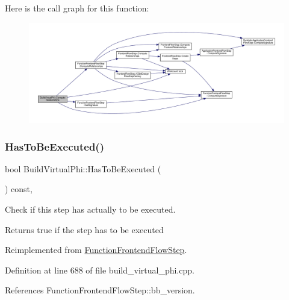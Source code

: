 Here is the call graph for this function\+:
\nopagebreak
\begin{figure}[H]
\begin{center}
\leavevmode
\includegraphics[width=350pt]{d8/d9b/classBuildVirtualPhi_a91ad5ae49dfe85e06f47e88df0dab90d_cgraph}
\end{center}
\end{figure}
\mbox{\label{classBuildVirtualPhi_adc93051d46113e21948c8672a0fc4f04}} 
\subsubsection{\texorpdfstring{Has\+To\+Be\+Executed()}{HasToBeExecuted()}}
{\footnotesize\ttfamily bool Build\+Virtual\+Phi\+::\+Has\+To\+Be\+Executed (\begin{DoxyParamCaption}{ }\end{DoxyParamCaption}) const\hspace{0.3cm}{\ttfamily [override]}, {\ttfamily [virtual]}}



Check if this step has actually to be executed. 

\begin{DoxyReturn}{Returns}
true if the step has to be executed 
\end{DoxyReturn}


Reimplemented from \hyperlink{classFunctionFrontendFlowStep_a12e786363530aa9533e4bd9380130d75}{Function\+Frontend\+Flow\+Step}.



Definition at line 688 of file build\+\_\+virtual\+\_\+phi.\+cpp.



References Function\+Frontend\+Flow\+Step\+::bb\+\_\+version.

